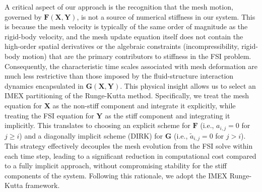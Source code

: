 \documentclass{article}
\begin{document}
A critical aspect of our approach is the recognition that the mesh motion, governed by $\mathbf{F}(\mathbf{X}, \mathbf{Y})$, is not a source of numerical stiffness in our system. This is because the mesh velocity is typically of the same order of magnitude as the rigid-body velocity, and the mesh update equation itself does not contain the high-order spatial derivatives or the algebraic constraints (incompressibility, rigid-body motion) that are the primary contributors to stiffness in the FSI problem. Consequently, the characteristic time scales associated with mesh deformation are much less restrictive than those imposed by the fluid-structure interaction dynamics encapsulated in $\mathbf{G}(\mathbf{X}, \mathbf{Y})$. This physical insight allows us to select an IMEX partitioning of the Runge-Kutta method. Specifically, we treat the mesh equation for $\mathbf{X}$ as the non-stiff component and integrate it explicitly, while treating the FSI equation for $\mathbf{Y}$ as the stiff component and integrating it implicitly. This translates to choosing an explicit scheme for $\mathbf{F}$ (i.e., $a_{i,j} = 0$ for $j \geq i$) and a diagonally implicit scheme (DIRK) for $\mathbf{G}$ (i.e., $\tilde{a}_{i,j} = 0$ for $j > i$). This strategy effectively decouples the mesh evolution from the FSI solve within each time step, leading to a significant reduction in computational cost compared to a fully implicit approach, without compromising stability for the stiff components of the system. Following this rationale, we adopt the IMEX Runge-Kutta framework. 
\end{document}
